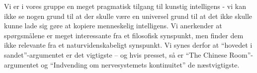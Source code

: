 Vi er i vores gruppe en meget pragmatisk tilgang til kunstig intelligens - vi
kan ikke se nogen grund til at der skulle være en universel grund til at det
ikke skulle kunne lade sig gøre at kopiere menneskelig intelligens. Vi
anerkender at spørgsmålene er meget interessante fra et filosofisk synspunkt,
men finder dem ikke relevante fra et naturvidenskabeligt synspunkt. Vi synes
derfor at ``hovedet i sandet''-argumentet er det vigtigste -- og hvis presset,
så er ``The Chinese Room''-argumentet og ``Indvending om nervesystemets
kontinuitet'' de næstvigtigste.
